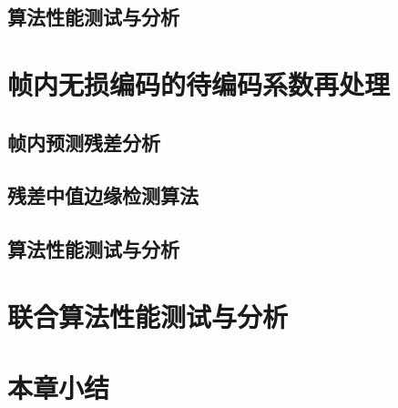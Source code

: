 \subsection{算法性能测试与分析}


\section{帧内无损编码的待编码系数再处理}

\subsection{帧内预测残差分析}


\subsection{残差中值边缘检测算法}

\subsection{算法性能测试与分析}


\section{联合算法性能测试与分析}

\section{本章小结}